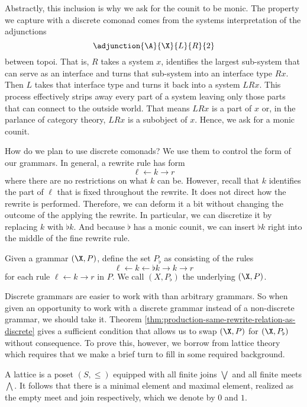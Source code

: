 Abstractly, this inclusion is why we ask for the counit to be monic. The
property we capture with a discrete comonad comes from the
systems interpretation of the adjunctions
\[
  \adjunction{\A}{\X}{L}{R}{2}
\]
between topoi. That is, $ R $ takes a system $ x $,
identifies the largest sub-system that can serve as an
interface and turns that sub-system into an interface type
$ Rx $. Then $ L $ takes that interface type and turns it
back into a system $ LRx $. This process effectively strips
away every part of a system leaving only those parts that
can connect to the outside world. That means $ LRx $ is a
part of $ x $ or, in the parlance of category theory,
$ LRx $ is a subobject of $ x $.  Hence, we ask for a monic
counit.

How do we plan to use discrete comonads?  We use them to
control the form of our grammars.  In general, a rewrite
rule has form
\[
  \ell \gets k \to r
\]
where there are no restrictions on what $ k $ can be.
However, recall that $ k $ identifies the part of $ \ell $
that is fixed throughout the rewrite. It does not direct how
the rewrite is performed.  Therefore, we can deform it a bit
without changing the outcome of the applying the rewrite.
In particular, we can discretize it by replacing $ k $ with
$ \flat k $.  And because $ \flat $ has a monic counit, we
can insert $ \flat k $ right into the middle of the
fine rewrite rule.

\begin{definition}
  Given a grammar $ ( \X , P ) $, define the set $ P_\flat $
  as consisting of the rules
  \[
    \ell \gets k \gets \flat k \to k \to r
  \]
  for each rule $ \ell \gets k \to r $ in $ P $. We call $
  ( X , P_\flat ) $ the  underlying $
  ( \X, P ) $.
\end{definition}

Discrete grammars are easier to work with than arbitrary
grammars. So when given an opportunity to work with a
discrete grammar instead of a non-discrete grammar, we
should take it. Theorem
\ref{thm:production-same-rewrite-relation-as-discrete} gives
a sufficient condition that allows us to swap $ ( \X,P ) $
for $ ( \X,P_\flat ) $ without consequence. To prove this,
however, we borrow from lattice theory which requires that
we make a brief turn to fill in some required background.

\begin{definition}[Lattice]
  A lattice is a poset $ ( S, \leq ) $ equipped with all
  finite joins $ \bigvee $ and all finite meets
  $ \bigwedge $. It follows that there is a minimal element
  and maximal element, realized as the empty meet and join
  respectively, which we denote by $ 0 $ and $ 1 $.
\end{definition}


